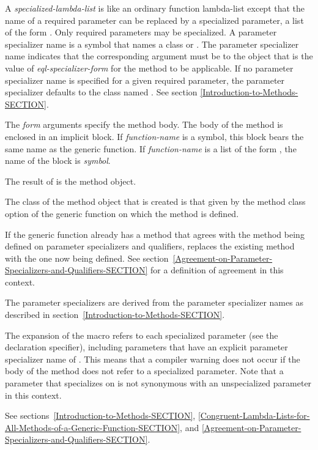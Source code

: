 \begin{defmac}
A \emph{specialized-lambda-list\/} is like an ordinary
function lambda-list except that the name of a required parameter can
be replaced by a specialized parameter, a
list of the form .  Only required parameters may be
specialized.  A parameter specializer name is a symbol that names a
class or .  The parameter
specializer name  indicates
that the corresponding argument must be  to the object that
is the value of \emph{eql-specializer-form\/} for the method to be
applicable.  If no parameter specializer name is specified for a given
required parameter, the parameter specializer defaults to the class
named .  See section \ref{Introduction-to-Methods-SECTION}.

The \emph{form\/} arguments specify the method body.
The body of the method is enclosed in an implicit block.  If
\emph{function-name\/} is a symbol, this block bears the same name as the
generic function.  If \emph{function-name\/} is a list of the form 
, the name of the block is \emph{symbol}.  


The result of  is the method object.


The class of the method object that is created is that given by the 
method class option of the generic function on which the method is defined.

If the generic function already has a method that agrees with the
method being defined on parameter specializers and qualifiers, 
 replaces the existing method with the one now being
defined.  See
section~\ref{Agreement-on-Parameter-Specializers-and-Qualifiers-SECTION}
for a definition of agreement in this context.

The parameter specializers are derived from the parameter specializer
names as described in section~\ref{Introduction-to-Methods-SECTION}.

The expansion of the  macro refers to each
specialized parameter (see the  declaration specifier), including
parameters that
have an explicit parameter specializer name of .  This means
that a compiler warning does not occur if the body of the method does
not refer to a specialized parameter.  Note that a parameter that
specializes on  is not synonymous with an unspecialized
parameter in this context.

See sections~\ref{Introduction-to-Methods-SECTION},
\ref{Congruent-Lambda-Lists-for-All-Methods-of-a-Generic-Function-SECTION},
and \ref{Agreement-on-Parameter-Specializers-and-Qualifiers-SECTION}.
\end{defmac}


